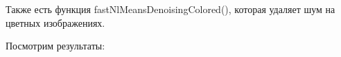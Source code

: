 \documentclass[14pt,a4paper,report]{report}
\begin{document}
\clearpage
Также есть функция fastNlMeansDenoisingColored(), которая удаляет шум на цветных изображениях.

Посмотрим результаты:

\begin{figure}[h]
\begin{minipage}[h]{0.47\linewidth}
\end{minipage}
\hfill
\begin{minipage}[h]{0.47\linewidth}

\end{minipage}
\end{figure}
\end{document}
